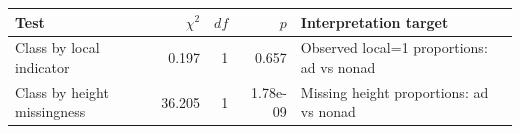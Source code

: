 \begin{tabular}{lrrrl}
\toprule
Test & $\chi^2$ & $df$ & $p$ & Interpretation target
\\
\midrule
Class by local indicator & 0.197 & 1 & 0.657 & Observed local=1 proportions: ad vs nonad
\\
Class by height missingness & 36.205 & 1 & 1.78e-09 & Missing height proportions: ad vs nonad
\\
\bottomrule
\end{tabular}
